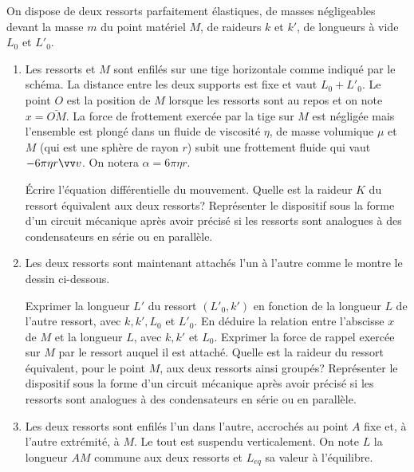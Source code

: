 \begin{exercice}
  On dispose de deux ressorts parfaitement élastiques, de masses négligeables
  devant la masse \(m\) du point matériel \(M\), de raideurs \(k\) et \(k'\), de
  longueurs à vide \(L_0\) et \(L'_0\).
  \begin{enumerate}
    \item Les ressorts et \(M\) sont enfilés sur une tige horizontale comme
      indiqué par le schéma. La distance entre les deux supports est fixe et
      vaut \(L_0+L'_0\). Le point \(O\) est la position de \(M\) lorsque les
      ressorts sont au repos et on note \(x = \bar{OM}\).
      La force de frottement exercée par la tige sur \(M\) est négligée mais
      l'ensemble est plongé dans un fluide de viscosité \(\eta\), de masse
      volumique \(\mu\) et \(M\) (qui est une sphère de rayon \(r\)) subit une
      frottement fluide qui vaut \(-6\pi\eta r \vvv\). On notera \(\alpha =
      6\pi\eta r\).

      Écrire l'équation différentielle du mouvement. Quelle est la raideur \(K\)
      du ressort équivalent aux deux ressorts? Représenter le dispositif sous la
      forme d'un circuit mécanique après avoir précisé si les ressorts sont
      analogues à des condensateurs en série ou en parallèle.
    \item Les deux ressorts sont maintenant attachés l'un à l'autre comme le
      montre le dessin ci-dessous.

      Exprimer la longueur \(L'\) du ressort \((L'_0, k')\) en fonction de la
      longueur \(L\) de l'autre ressort, avec \(k, k', L_0\) et \(L'_0\). En
      déduire la relation entre l'abscisse \(x\) de \(M\) et la longueur \(L\),
      avec \(k, k'\) et \(L_0\). Exprimer la force de rappel exercée sur \(M\)
      par le ressort auquel il est attaché. Quelle est la raideur du ressort
      équivalent, pour le point \(M\), aux deux ressorts ainsi groupés?
      Représenter le dispositif sous la forme d'un circuit mécanique après avoir
      précisé si les ressorts sont analogues à des condensateurs en série ou en
      parallèle.
    \item Les deux ressorts sont enfilés l'un dans l'autre, accrochés au point
      \(A\) fixe et, à l'autre extrémité, à \(M\). Le tout est suspendu
      verticalement. On note \(L\) la longueur \(AM\) commune aux deux ressorts
      et \(L_{eq}\) sa valeur à l'équilibre.


\end{enumerate}
\end{exercice}
